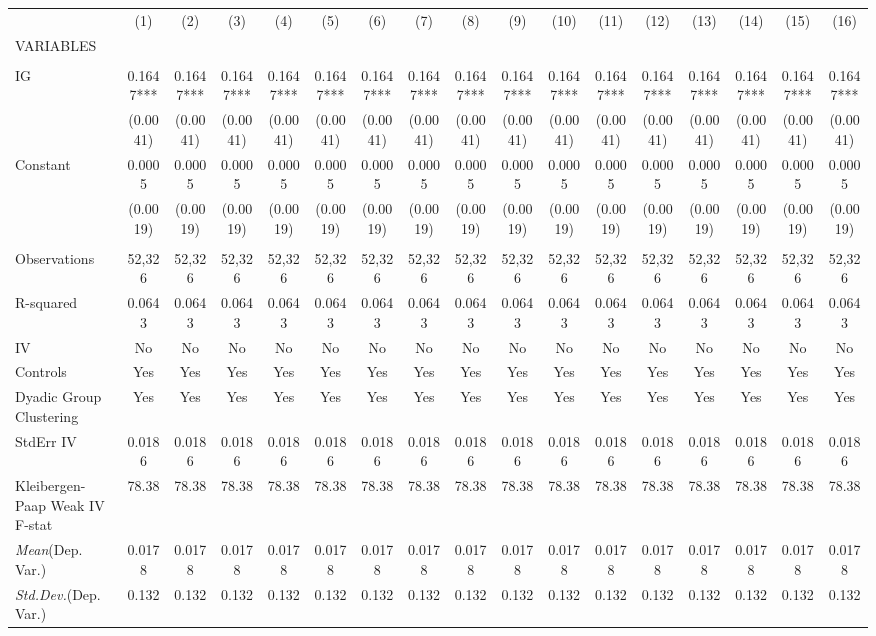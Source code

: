 \documentclass[]{article}
\begin{document}
\begin{tabular}{lcccccccccccccccc} \hline
 & (1) & (2) & (3) & (4) & (5) & (6) & (7) & (8) & (9) & (10) & (11) & (12) & (13) & (14) & (15) & (16) \\
VARIABLES &  &  &  &  &  &  &  &  &  &  &  &  &  &  &  &  \\ \hline
 &  &  &  &  &  &  &  &  &  &  &  &  &  &  &  &  \\
IG & 0.1647*** & 0.1647*** & 0.1647*** & 0.1647*** & 0.1647*** & 0.1647*** & 0.1647*** & 0.1647*** & 0.1647*** & 0.1647*** & 0.1647*** & 0.1647*** & 0.1647*** & 0.1647*** & 0.1647*** & 0.1647*** \\
 & (0.0041) & (0.0041) & (0.0041) & (0.0041) & (0.0041) & (0.0041) & (0.0041) & (0.0041) & (0.0041) & (0.0041) & (0.0041) & (0.0041) & (0.0041) & (0.0041) & (0.0041) & (0.0041) \\
Constant & 0.0005 & 0.0005 & 0.0005 & 0.0005 & 0.0005 & 0.0005 & 0.0005 & 0.0005 & 0.0005 & 0.0005 & 0.0005 & 0.0005 & 0.0005 & 0.0005 & 0.0005 & 0.0005 \\
 & (0.0019) & (0.0019) & (0.0019) & (0.0019) & (0.0019) & (0.0019) & (0.0019) & (0.0019) & (0.0019) & (0.0019) & (0.0019) & (0.0019) & (0.0019) & (0.0019) & (0.0019) & (0.0019) \\
 &  &  &  &  &  &  &  &  &  &  &  &  &  &  &  &  \\
Observations & 52,326 & 52,326 & 52,326 & 52,326 & 52,326 & 52,326 & 52,326 & 52,326 & 52,326 & 52,326 & 52,326 & 52,326 & 52,326 & 52,326 & 52,326 & 52,326 \\
R-squared & 0.0643 & 0.0643 & 0.0643 & 0.0643 & 0.0643 & 0.0643 & 0.0643 & 0.0643 & 0.0643 & 0.0643 & 0.0643 & 0.0643 & 0.0643 & 0.0643 & 0.0643 & 0.0643 \\
IV & No & No & No & No & No & No & No & No & No & No & No & No & No & No & No & No \\
Controls & Yes & Yes & Yes & Yes & Yes & Yes & Yes & Yes & Yes & Yes & Yes & Yes & Yes & Yes & Yes & Yes \\
Dyadic Group Clustering & Yes & Yes & Yes & Yes & Yes & Yes & Yes & Yes & Yes & Yes & Yes & Yes & Yes & Yes & Yes & Yes \\
StdErr IV & 0.0186 & 0.0186 & 0.0186 & 0.0186 & 0.0186 & 0.0186 & 0.0186 & 0.0186 & 0.0186 & 0.0186 & 0.0186 & 0.0186 & 0.0186 & 0.0186 & 0.0186 & 0.0186 \\
Kleibergen-Paap Weak IV F-stat & 78.38 & 78.38 & 78.38 & 78.38 & 78.38 & 78.38 & 78.38 & 78.38 & 78.38 & 78.38 & 78.38 & 78.38 & 78.38 & 78.38 & 78.38 & 78.38 \\
\textit{Mean}(Dep. Var.) & 0.0178 & 0.0178 & 0.0178 & 0.0178 & 0.0178 & 0.0178 & 0.0178 & 0.0178 & 0.0178 & 0.0178 & 0.0178 & 0.0178 & 0.0178 & 0.0178 & 0.0178 & 0.0178 \\
 \textit{Std.Dev.}(Dep. Var.) & 0.132 & 0.132 & 0.132 & 0.132 & 0.132 & 0.132 & 0.132 & 0.132 & 0.132 & 0.132 & 0.132 & 0.132 & 0.132 & 0.132 & 0.132 & 0.132 \\ \hline
\end{tabular}
\end{document}
